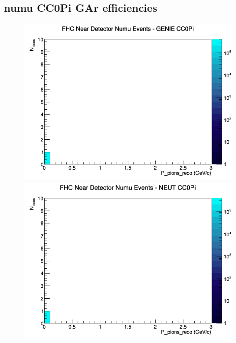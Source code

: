 \documentclass[12pt]{article}
\begin{document}
\subsection{numu CC0Pi GAr efficiencies}
\begin{figure}[h]
\includegraphics[width=\linewidth]{eff_N_P/GAr/pions/CC0Pi_FHC_ND_numu_N_P_GENIE.png}
\endminipage
{}
\includegraphics[width=\linewidth]{eff_N_P/GAr/pions/CC0Pi_FHC_ND_numu_N_P_NEUT.png}
\endminipage
{}

\end{figure}
\end{document}
